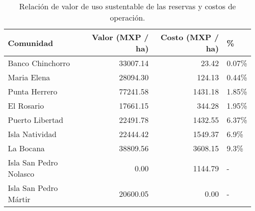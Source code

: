 \begin{table}[!h]

\caption{\label{tab:sust_val_cost}Relación de valor de uso sustentable de las reservas y costos de operación.}
\centering
\begin{tabular}[t]{lrrl}
\toprule
Comunidad & Valor (MXP / ha) & Costo (MXP / ha) & \%\\
\midrule
Banco Chinchorro & 33007.14 & 23.42 & 0.07\%\\
Maria Elena & 28094.30 & 124.13 & 0.44\%\\
Punta Herrero & 77241.58 & 1431.18 & 1.85\%\\
El Rosario & 17661.15 & 344.28 & 1.95\%\\
Puerto Libertad & 22491.78 & 1432.55 & 6.37\%\\
\addlinespace
Isla Natividad & 22444.42 & 1549.37 & 6.9\%\\
La Bocana & 38809.56 & 3608.15 & 9.3\%\\
Isla San Pedro Nolasco & 0.00 & 1144.79 & -\\
Isla San Pedro Mártir & 20600.05 & 0.00 & -\\
\bottomrule
\end{tabular}
\end{table}